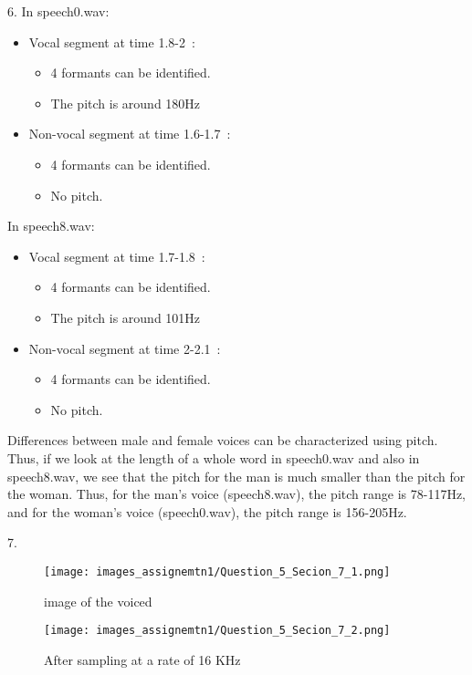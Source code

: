 \documentclass[letterpaper, 12pt]{article}
\begin{document}
6. In speech0.wav:
   \begin{itemize}
       \item Vocal segment at time 1.8-2~:
       \begin{itemize}
           \item 4 formants can be identified.
           \item The pitch is around 180Hz~
       \end{itemize}
       \item Non-vocal segment at time 1.6-1.7~:
       \begin{itemize}
           \item 4 formants can be identified.
           \item No pitch.
       \end{itemize}
   \end{itemize}
   
   In speech8.wav:
   \begin{itemize}
       \item Vocal segment at time 1.7-1.8~:
       \begin{itemize}
           \item 4 formants can be identified.
           \item The pitch is around 101Hz~
       \end{itemize}
       \item Non-vocal segment at time 2-2.1~:
       \begin{itemize}
           \item 4 formants can be identified.
           \item No pitch.
       \end{itemize}
   \end{itemize}
   
   Differences between male and female voices can be characterized using pitch. Thus, if we look at the length of a whole word in speech0.wav and also in speech8.wav, we see that the pitch for the man is much smaller than the pitch for the woman. Thus, for the man's voice (speech8.wav), the pitch range is 78-117Hz, and for the woman's voice (speech0.wav), the pitch range is 156-205Hz.

7. 
\begin{figure}[htbp]
    \centering
    \texttt{[image: images\_assignemtn1/Question\_5\_Secion\_7\_1.png]}
    \caption{image of the voiced}
    \label{fig:sec_7_1}
\end{figure}

\begin{figure}[htbp]
    \centering
    \texttt{[image: images\_assignemtn1/Question\_5\_Secion\_7\_2.png]}
    \caption{After sampling at a rate of 16 KHz}
    \label{fig:sec_7_2}
\end{figure}
\end{document}
